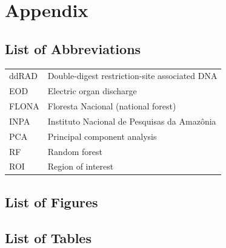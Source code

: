 \clearpage
\section{Appendix}


\subsection{List of Abbreviations}
\begin{tabular}{ll}

    ddRAD & Double-digest restriction-site associated DNA \\
    EOD & Electric organ discharge \\
    FLONA & Floresta Nacional (national forest) \\
    INPA & Instituto Nacional de Pesquisas da Amaz{\^o}nia \\
    PCA & Principal component analysis \\
    RF & Random forest \\
    ROI & Region of interest \\


\end{tabular}

\makeatletter
\renewcommand{\listoffigures}{%
  \@starttoc{lof} %
}
\makeatother
\subsection{List of Figures}
\listoffigures

\makeatletter
\renewcommand{\listoftables}{%
}
\makeatother
\subsection{List of Tables}
\listoftables

\newpage
